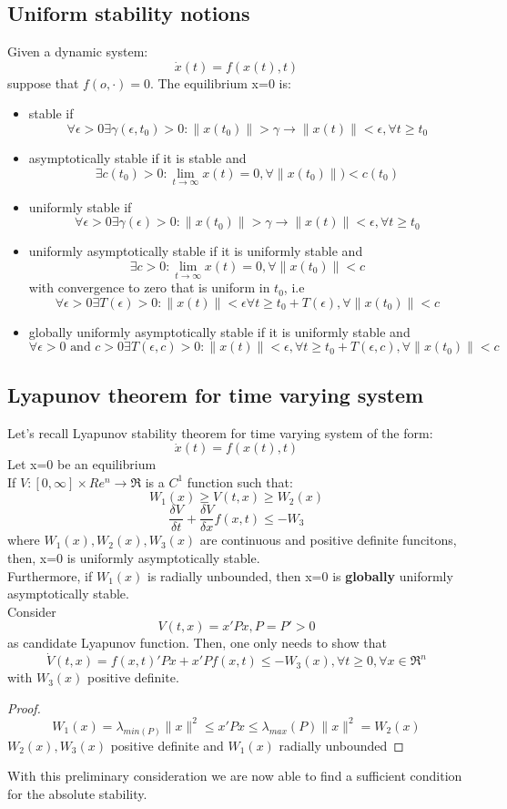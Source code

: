 \subsection{Uniform stability notions}
Given a dynamic system:
\[\dot{x}(t)=f(x(t),t)\] suppose that $f(o,\cdot)=0$. The equilibrium x=0 is:
\begin{itemize}
	\item stable if \[\forall\epsilon>0 \exists \gamma(\epsilon,t_0)>0\colon\|x(t_0)\|>\gamma\to\|x(t)\|<\epsilon,\forall t\ge t_0\]
	\item asymptotically stable if it is stable and \[\exists c(t_0)>0\colon \lim_{t\rightarrow \infty}x(t)=0,\forall\|x(t_0)\|)<c(t_0)	\]
	\item uniformly stable if \[\forall\epsilon>0 \exists \gamma(\epsilon)>0\colon\|x(t_0)\|>\gamma\to\|x(t)\|<\epsilon,\forall t\ge t_0\]
	\item uniformly asymptotically stable if it is uniformly stable and \[ \exists c >0\colon \lim_{t\rightarrow\infty}x(t)=0,\forall \|x(t_0)\|<c\] with convergence to zero that is uniform in $t_0$, i.e \[\forall\epsilon>0\exists T(\epsilon)>0\colon\|x(t)\|<\epsilon\forall t\ge t_0+T(\epsilon),\forall \|x(t_0)\|<c\]
	\item globally uniformly asymptotically stable if it is uniformly stable and \[\forall \epsilon >0 \text{ and } c>0 \exists T(\epsilon,c)> 0\colon\|x(t)\|<\epsilon, \forall t \ge t_0+T(\epsilon,c), \forall\|x(t_0)\|<c\]
\end{itemize}
\subsection{Lyapunov theorem for time varying system} \label{LYAptv}
Let's recall Lyapunov stability theorem for time varying system of the form:\[\dot{x}(t)=f(x(t),t)	\]
Let x=0 be an equilibrium\\If $V\colon [0,\infty]\times 	Re^n\to\Re$ is a $C^1$ function such that:\[W_1(x)\ge V(t,x) \ge W_2(x)\]\[\frac{\delta V}{\delta t}+\frac{\delta V}{\delta x}f(x,t)\le-W_3\] where $W_1(x), W_2(x), W_3(x)$ are continuous and positive definite funcitons, then, x=0 is uniformly asymptotically stable.\\Furthermore, if $W_1(x)$ is radially unbounded, then x=0 is \textbf{globally} uniformly asymptotically stable.\\Consider\[V(t,x)=x'Px,P=P'>0\] as candidate Lyapunov function. Then, one only needs to show that \[\dot{V}(t,x)=f(x,t)'Px+x'Pf(x,t)\le-W_3(x),\forall t\ge 0,\forall x \in \Re^n\] with $W_3(x)$ positive definite.
\begin{proof}
	\[W_1(x)=\lambda_{min(P)}\|x\|^2\le x'Px\le\lambda_{max}(P)\|x\|^2=W_2(x)\] $W_2(x), W_3(x)$ positive definite and $W_1(x)$ radially unbounded
\end{proof}
With this preliminary consideration we are now able to find a sufficient condition for the absolute stability.
